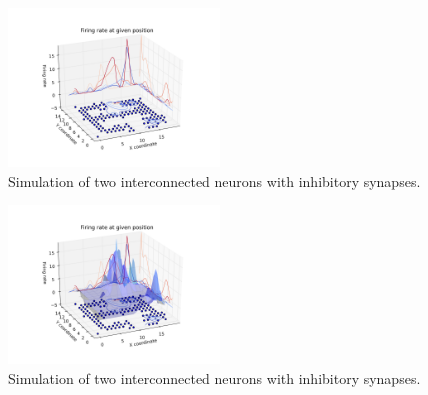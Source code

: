 \documentclass[12pt,a4paper,twocolumn]{article}
\begin{document}
\begin{figure}[htbp]
\centering
\includegraphics[width=0.5\textwidth]{figure8_a.png}
\caption{Simulation of two interconnected neurons with inhibitory synapses.\label{fig:part4b}}
\vspace{0.2cm}
\end{figure}
\begin{figure}[htbp]
\centering
\includegraphics[width=0.5\textwidth]{figure8_b.png}
\caption{Simulation of two interconnected neurons with inhibitory synapses.\label{fig:part4b}}
\vspace{0.2cm}
\end{figure}
\end{document}
